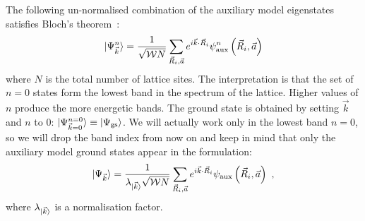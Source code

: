 \documentclass{report}
\numberwithin{equation}{section}
\begin{document}
The following un-normalised combination of the auxiliary model eigenstates satisfies Bloch's theorem~\cite{stoyanova}:
\begin{equation}\begin{aligned}
	\ket{\Psi^n_{\vec k}} = \frac{1}{\sqrt{\mathcal{W} N}}\sum_{\vec R_i, \vec a} e^{i \vec{k}\cdot\vec{R}_i} \psi^n_\text{aux}\left(\vec R_i, \vec a\right)
\end{aligned}\end{equation}
where \(N\) is the total number of lattice sites. The interpretation is that the set of \(n=0\) states form the lowest band in the spectrum of the lattice. Higher values of \(n\) produce the more energetic bands. The ground state is obtained by setting \(\vec k\) and \(n\) to 0: \(\ket{\Psi_{\vec k=0}^{n=0}} \equiv \ket{\Psi_\text{gs}}\). We will actually work only in the lowest band \(n=0\), so we will drop the band index from now on and keep in mind that only the auxiliary model ground states appear in the formulation:
\begin{equation}\begin{aligned}
	\label{bloch-states}
	\ket{\Psi_{\vec k}} = \frac{1}{\lambda_{\ket{\vec k}} \sqrt{\mathcal{W} N}}\sum_{\vec R_i, \vec a} e^{i \vec{k}\cdot\vec{R}_i} \psi_\text{aux}\left(\vec R_i, \vec a\right)~,
\end{aligned}\end{equation}
where \(\lambda_{\ket{\vec k}}\) is a normalisation factor.
\end{document}
